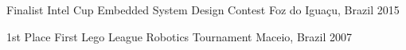 




\begin{cvhonors}


\cvhonor
{Finalist} %
{Intel Cup Embedded System Design Contest} %
{Foz do Iguaçu, Brazil} %
{2015} %


\cvhonor
{1st Place} %
{First Lego League Robotics Tournament} %
{Maceio, Brazil} %
{2007} %


\end{cvhonors}